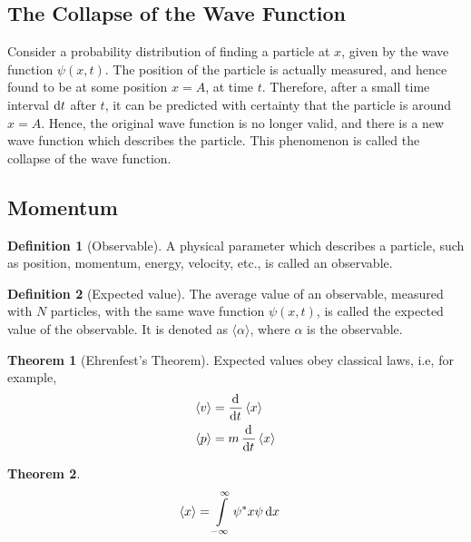 \documentclass[titlepage, fleqn, a4paper, 12pt, twoside]{article}
\theoremstyle{definition}
\newtheorem{definition}{Definition}
\theoremstyle{theorem}
\newtheorem{theorem}{Theorem}
\begin{document}
\subsection{The Collapse of the Wave Function}

Consider a probability distribution of finding a particle at $x$, given by the wave function $\psi(x,t)$.
The position of the particle is actually measured, and hence found to be at some position $x = A$, at time $t$.
Therefore, after a small time interval $\dif t$ after $t$, it can be predicted with certainty that the particle is around $x = A$.
Hence, the original wave function is no longer valid, and there is a new wave function which describes the particle.
This phenomenon is called the collapse of the wave function.

\subsection{Momentum}

\begin{definition}[Observable]
	A physical parameter which describes a particle, such as position, momentum, energy, velocity, etc., is called an observable.
\end{definition}

\begin{definition}[Expected value]
	The average value of an observable, measured with $N$ particles, with the same wave function $\psi(x,t)$, is called the expected value of the observable.
	It is denoted as $\langle \alpha \rangle$, where $\alpha$ is the observable.
\end{definition}

\begin{theorem}[Ehrenfest's Theorem]
	Expected values obey classical laws, i.e, for example,
	\begin{align*}
		\langle v \rangle & = \dod{}{t} \langle x \rangle   \\
		\langle p \rangle & = m \dod{}{t} \langle x \rangle \\
	\end{align*}
	\label{Ehrenfest's_Theorem}
\end{theorem}

\begin{theorem}
	\begin{align*}
		\langle x \rangle & = \int\limits_{-\infty}^{\infty} \psi^* x \psi \dif x
	\end{align*}
\end{theorem}
\end{document}
